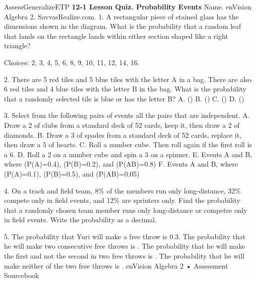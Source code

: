 \documentclass{article}
\newenvironment{te-addendum}[2]{}{}     %
\newcommand{\answer}[1]{}               %
\newcommand{\placeholder}[2]{}          %
\begin{document}
\begin{te-addendum}{Assess}{GeneralizeETP}
\textbf{12-1 Lesson Quiz. Probability Events}
Name. enVision Algebra 2. SavvasRealize.com.
1. A rectangular piece of stained glass has the dimensions shown in the diagram. What is the probability that a random leaf that lands on the rectangle lands within either section shaped like a right triangle?
\placeholder{diagram}{Rectangle height 5 cm; bottom split into 2 cm, 3 cm, 6 cm segments. Segment from top left to first bottom division; segment from top right to second bottom division.}
Choices: 2, 3, 4, 5, 6, 8, 9, 10, 11, 12, 14, 16.
\answer{(\frac{4}{11})}
2. There are 5 red tiles and 5 blue tiles with the letter A in a bag. There are also 6 red tiles and 4 blue tiles with the letter B in the bag. What is the probability that a randomly selected tile is blue or has the letter B?
A. ()
B. ()
C. ()
D. ()
\answer{C}
3. Select from the following pairs of events all the pairs that are independent.
A. Draw a 2 of clubs from a standard deck of 52 cards, keep it, then draw a 2 of diamonds.
B. Draw a 3 of spades from a standard deck of 52 cards, replace it, then draw a 5 of hearts.
C. Roll a number cube. Then roll again if the first roll is a 6.
D. Roll a 2 on a number cube and spin a 3 on a spinner.
E. Events A and B, where (P(A)=0.4), (P(B)=0.2), and (P(AB)=0.8)
F. Events A and B, where (P(A)=0.1), (P(B)=0.5), and (P(AB)=0.05)
\answer{B, D, F}
4. On a track and field team, 8\% of the members run only long-distance, 32\% compete only in field events, and 12\% are sprinters only. Find the probability that a randomly chosen team member runs only long-distance or competes only in field events. Write the probability as a decimal.
\answer{0.4}
5. The probability that Yuri will make a free throw is 0.3. The probability that he will make two consecutive free throws is \answer{0.09}. The probability that he will make the first and not the second in two free throws is \answer{0.21}. The probability that he will make neither of the two free throws is \answer{0.49}.
enVision Algebra 2 • Assessment Sourcebook
\end{te-addendum}
\end{document}
